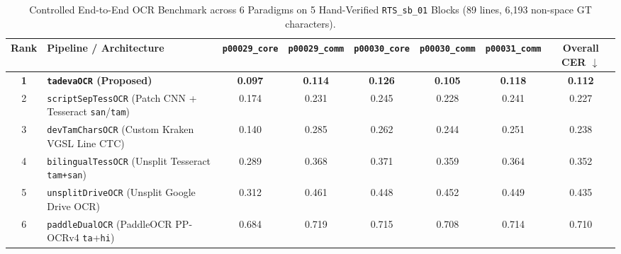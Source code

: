 \documentclass[10pt,twocolumn]{article}
\begin{document}
\begin{table}[t]
\centering
\caption{Controlled End-to-End OCR Benchmark across 6 Paradigms on 5 Hand-Verified \texttt{RTS\_sb\_01} Blocks (89 lines, 6,193 non-space GT characters).}
\label{tab:benchmark}
\small
\begin{tabular}{clcccccc}
\toprule
\textbf{Rank} & \textbf{Pipeline / Architecture} & \texttt{p00029\_core} & \texttt{p00029\_comm} & \texttt{p00030\_core} & \texttt{p00030\_comm} & \texttt{p00031\_comm} & \textbf{Overall CER} $\downarrow$ \\
\midrule
\textbf{1} & \textbf{\texttt{tadevaOCR} (Proposed)} & \textbf{0.097} & \textbf{0.114} & \textbf{0.126} & \textbf{0.105} & \textbf{0.118} & \textbf{0.112} \\
2 & \texttt{scriptSepTessOCR} (Patch CNN + Tesseract \texttt{san}/\texttt{tam}) & 0.174 & 0.231 & 0.245 & 0.228 & 0.241 & 0.227 \\
3 & \texttt{devTamCharsOCR} (Custom Kraken VGSL Line CTC) & 0.140 & 0.285 & 0.262 & 0.244 & 0.251 & 0.238 \\
4 & \texttt{bilingualTessOCR} (Unsplit Tesseract \texttt{tam+san}) & 0.289 & 0.368 & 0.371 & 0.359 & 0.364 & 0.352 \\
5 & \texttt{unsplitDriveOCR} (Unsplit Google Drive OCR) & 0.312 & 0.461 & 0.448 & 0.452 & 0.449 & 0.435 \\
6 & \texttt{paddleDualOCR} (PaddleOCR PP-OCRv4 \texttt{ta}+\texttt{hi}) & 0.684 & 0.719 & 0.715 & 0.708 & 0.714 & 0.710 \\
\bottomrule
\end{tabular}
\end{table}
\end{document}
